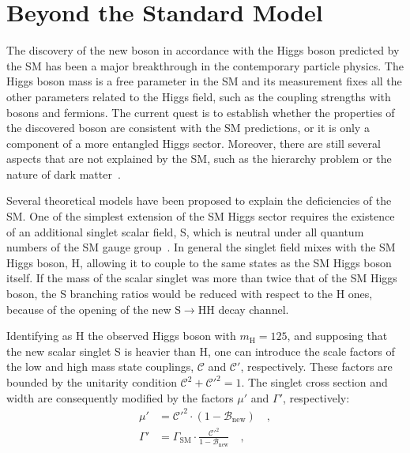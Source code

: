 \section{Beyond the Standard Model}
\label{sec:BSM}

The discovery of the new boson in accordance with the Higgs boson predicted by the SM has been a major breakthrough in the contemporary particle physics. The Higgs boson mass is a free parameter in the SM and its measurement fixes all the other parameters related to the Higgs field, such as the coupling strengths with bosons and fermions. The current quest is to establish whether the properties of the discovered boson are consistent with the SM predictions, or it is only a component of a more entangled Higgs sector. Moreover, there are still several aspects that are not explained by the SM, such as the hierarchy problem or the nature of dark matter~\cite{Langacker:2010zza}.

Several theoretical models have been proposed to explain the deficiencies of the SM. One of the simplest extension of the SM Higgs sector requires the existence of an additional singlet scalar field, S, which is neutral under all quantum numbers of the SM gauge group~\cite{Robens:2015gla}. In general the singlet field mixes with the SM Higgs boson, H, allowing it to couple to the same states as the SM Higgs boson itself. If the mass of the scalar singlet was more than twice that of the SM Higgs boson, the S branching ratios would be reduced with respect to the H ones, because of the opening of the new $\mathrm{S \to HH}$ decay channel.

Identifying as H the observed Higgs boson with $m_\mathrm{H} = 125$\GeV, and supposing that the new scalar singlet S is heavier than H, one can introduce the scale factors of the low and high mass state couplings, $\mathcal{C}$ and $\mathcal{C'}$, respectively. These factors are bounded by the unitarity condition $\mathcal{C}^2 + \mathcal{C'}^2 = 1$. The singlet cross section and width are consequently modified by the factors $\mu'$ and $\Gamma'$, respectively:
\begin{equation}
\begin{split}
\mu' &= \mathcal{C'}^2 \cdot (1 - \mathcal{B}_\mathrm{new}) \quad ,\\
\Gamma' &= \Gamma_\mathrm{SM} \cdot \frac{\mathcal{C'}^2}{1 - \mathcal{B}_\mathrm{new}} \quad ,
\end{split}
\end{equation}

